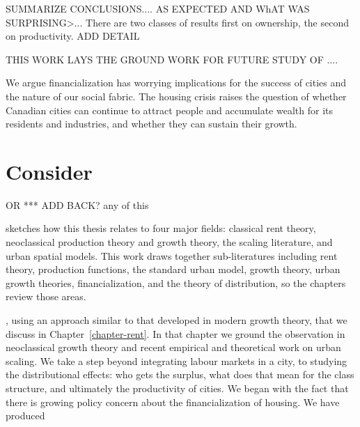 SUMMARIZE CONCLUSIONS.... AS EXPECTED AND WhAT WAS SURPRISING>...
There are two classes of results first on ownership, the second on productivity. ADD DETAIL

THIS WORK LAYS THE GROUND WORK FOR FUTURE STUDY OF ....


We argue financialization %
has worrying implications for the success of cities and the nature of our social fabric. 
The housing crisis raises the question of whether Canadian cities can continue to attract people and accumulate wealth for its residents and industries, and whether they can sustain their growth.


\section{Consider}
OR *** ADD BACK? any of this


sketches how this thesis relates to four major fields: classical rent theory, neoclassical production theory and growth theory, the scaling literature, and urban spatial models. %
    This work draws together sub-literatures including rent theory, production functions, the standard urban model, growth theory, urban growth theories, financialization, and the theory of distribution, so the chapters review those areas. %

    , using an approach similar to that developed in modern growth theory, that we discuss in Chapter~\ref{chapter-rent}.  In that chapter we ground the observation in  \gls{neoclassical growth theory} and recent empirical and theoretical work on \gls{urban scaling}. 
 We take a step beyond integrating labour markets in a city, to studying the distributional effects: who gets the surplus, what does that mean for the class structure, and ultimately the productivity of cities. 
We began with the fact that there is growing policy concern about the financialization of  housing. We have produced 


